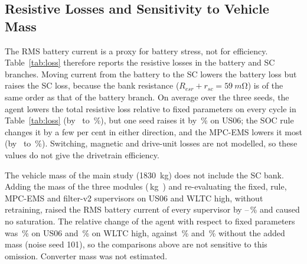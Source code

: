 \subsection{Resistive Losses and Sensitivity to Vehicle Mass}\label{sec:res_loss}

The RMS battery current is a proxy for battery stress, not for efficiency. Table~\ref{tab:loss} therefore reports the resistive losses in the battery and SC branches. Moving current from the battery to the SC lowers the battery loss but raises the SC loss, because the bank resistance ($R_{esr}+r_{sc}=\SI{59}{m\ohm}$) is of the same order as that of the battery branch. On average over the three seeds, the agent lowers the total resistive loss relative to fixed parameters on every cycle in Table~\ref{tab:loss} (by \LossTDMin\ to \LossTDMax\,\%), but one seed raises it by \LossTDUSSeedMax\,\% on US06; the SOC rule changes it by a few per cent in either direction, and the MPC-EMS lowers it most (by \LossMPCMin\ to \LossMPCMax\,\%). Switching, magnetic and drive-unit losses are not modelled, so these values do not give the drivetrain efficiency.

The vehicle mass of the main study (\SI{1830}{kg}) does not include the SC bank. Adding the mass of the three modules (\MassAddKg\,kg~\cite{maxwell125v}) and re-evaluating the fixed, rule, MPC-EMS and filter-v2 supervisors on US06 and WLTC high, without retraining, raised the RMS battery current of every supervisor by \MassIbIncMin--\MassIbIncMax\,\% and caused no saturation. The relative change of the agent with respect to fixed parameters was \MassDvtwoFixUS\,\% on US06 and \MassDvtwoFixWH\,\% on WLTC high, against \MassDvtwoFixRefUS\,\% and \MassDvtwoFixRefWH\,\% without the added mass (noise seed 101), so the comparisons above are not sensitive to this omission. Converter mass was not estimated.

